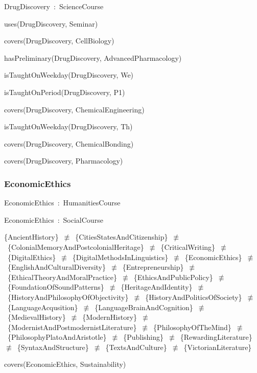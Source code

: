 \documentclass{article}
\begin{document}
DrugDiscovery~:~ScienceCourse

uses(DrugDiscovery, Seminar)

covers(DrugDiscovery, CellBiology)

hasPreliminary(DrugDiscovery, AdvancedPharmacology)

isTaughtOnWeekday(DrugDiscovery, We)

isTaughtOnPeriod(DrugDiscovery, P1)

covers(DrugDiscovery, ChemicalEngineering)

isTaughtOnWeekday(DrugDiscovery, Th)

covers(DrugDiscovery, ChemicalBonding)

covers(DrugDiscovery, Pharmacology)

\subsubsection*{EconomicEthics}

EconomicEthics~:~HumanitiesCourse

EconomicEthics~:~SocialCourse

\{AncientHistory\}~\ensuremath{\not\equiv}~\{CitiesStatesAndCitizenship\}~\ensuremath{\not\equiv}~\{ColonialMemoryAndPostcolonialHeritage\}~\ensuremath{\not\equiv}~\{CriticalWriting\}~\ensuremath{\not\equiv}~\{DigitalEthics\}~\ensuremath{\not\equiv}~\{DigitalMethodsInLinguistics\}~\ensuremath{\not\equiv}~\{EconomicEthics\}~\ensuremath{\not\equiv}~\{EnglishAndCulturalDiversity\}~\ensuremath{\not\equiv}~\{Entrepreneurship\}~\ensuremath{\not\equiv}~\{EthicalTheoryAndMoralPractice\}~\ensuremath{\not\equiv}~\{EthicsAndPublicPolicy\}~\ensuremath{\not\equiv}~\{FoundationOfSoundPatterns\}~\ensuremath{\not\equiv}~\{HeritageAndIdentity\}~\ensuremath{\not\equiv}~\{HistoryAndPhilosophyOfObjectivity\}~\ensuremath{\not\equiv}~\{HistoryAndPoliticsOfSociety\}~\ensuremath{\not\equiv}~\{LanguageAcqusition\}~\ensuremath{\not\equiv}~\{LanguageBrainAndCognition\}~\ensuremath{\not\equiv}~\{MedievalHistory\}~\ensuremath{\not\equiv}~\{ModernHistory\}~\ensuremath{\not\equiv}~\{ModernistAndPostmodernistLiterature\}~\ensuremath{\not\equiv}~\{PhilosophyOfTheMind\}~\ensuremath{\not\equiv}~\{PhilosophyPlatoAndAristotle\}~\ensuremath{\not\equiv}~\{Publishing\}~\ensuremath{\not\equiv}~\{RewardingLiterature\}~\ensuremath{\not\equiv}~\{SyntaxAndStructure\}~\ensuremath{\not\equiv}~\{TextsAndCulture\}~\ensuremath{\not\equiv}~\{VictorianLiterature\}

covers(EconomicEthics, Sustainability)
\end{document}

